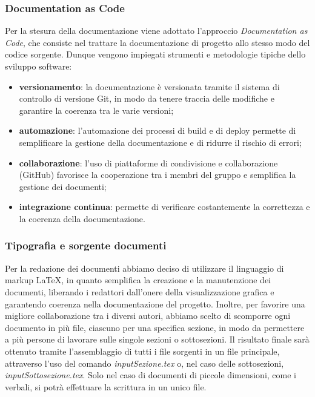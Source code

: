 \subsubsection{Documentation as Code}
Per la stesura della documentazione viene adottato l'approccio \textit{Documentation as Code}, che consiste nel trattare la documentazione di progetto allo stesso modo del codice sorgente. Dunque vengono impiegati strumenti e metodologie tipiche dello sviluppo software:
\begin{itemize}
	\item \textbf{versionamento}: la documentazione è versionata tramite il sistema di controllo di versione Git, in modo da tenere traccia
	      delle modifiche e garantire la coerenza tra le varie versioni;
	\item \textbf{automazione}: l'automazione dei processi di build e di deploy permette di semplificare la gestione della documentazione e
	      di ridurre il rischio di errori;
	\item \textbf{collaborazione}: l'uso di piattaforme di condivisione e collaborazione (GitHub) favorisce la cooperazione tra i membri
	      del gruppo e semplifica la gestione dei documenti;
	\item \textbf{integrazione continua}: permette di verificare costantemente la correttezza e la coerenza della documentazione.
\end{itemize}

\subsubsection{Tipografia e sorgente documenti}
Per la redazione dei documenti abbiamo deciso di utilizzare il linguaggio di markup LaTeX, in quanto semplifica la creazione e la manutenzione dei documenti, liberando i redattori dall'onere della visualizzazione grafica e garantendo coerenza nella documentazione del progetto. Inoltre, per favorire una migliore collaborazione tra i diversi autori, abbiamo scelto di scomporre ogni documento in più file,
ciascuno per una specifica sezione, in modo da permettere a più persone di lavorare sulle singole sezioni o sottosezioni.
Il risultato finale sarà ottenuto tramite l'assemblaggio di tutti i file sorgenti in un file principale, attraverso l'uso del comando
\textit{input{Sezione.tex}} o, nel caso delle sottosezioni, \textit{input{Sottosezione.tex}}. Solo nel caso di documenti di piccole dimensioni, come i verbali, si potrà effettuare la scrittura in un unico file.

